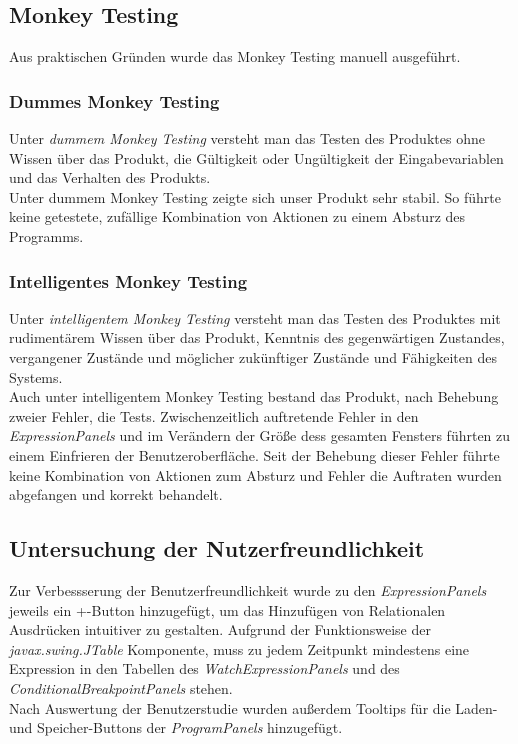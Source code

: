 \documentclass[parskip=full]{scrartcl}
\begin{document}
\subsection{Monkey Testing}
Aus praktischen Gründen wurde das Monkey Testing manuell ausgeführt.
\subsubsection{Dummes Monkey Testing}
Unter \textit{dummem Monkey Testing} versteht man das Testen des Produktes ohne Wissen über das Produkt, die Gültigkeit oder Ungültigkeit der Eingabevariablen und  das Verhalten des Produkts. \\
Unter dummem Monkey Testing zeigte sich unser Produkt sehr stabil. So führte keine getestete, zufällige Kombination von Aktionen zu einem Absturz des Programms. 
\subsubsection{Intelligentes Monkey Testing}
Unter \textit{intelligentem Monkey Testing} versteht man das Testen des Produktes mit rudimentärem Wissen über das Produkt, Kenntnis des gegenwärtigen Zustandes, vergangener Zustände und  möglicher zukünftiger Zustände und Fähigkeiten des Systems. \\
Auch unter intelligentem Monkey Testing bestand das Produkt, nach Behebung zweier Fehler, die Tests. Zwischenzeitlich auftretende Fehler in den \textit{ExpressionPanels} und im Verändern der Größe dess gesamten Fensters führten zu einem Einfrieren der Benutzeroberfläche. Seit der Behebung dieser Fehler führte keine Kombination von Aktionen zum Absturz und Fehler die Auftraten wurden abgefangen und korrekt behandelt.

\subsection{Untersuchung der Nutzerfreundlichkeit}
Zur Verbessserung der Benutzerfreundlichkeit wurde zu den \textit{ExpressionPanels} jeweils ein +-Button hinzugefügt, um das Hinzufügen von Relationalen Ausdrücken intuitiver zu gestalten. Aufgrund der Funktionsweise der \textit{javax.swing.JTable} Komponente, muss zu jedem Zeitpunkt mindestens eine Expression in den Tabellen des \textit{WatchExpressionPanels} und des \textit{ConditionalBreakpointPanels} stehen. \\
Nach Auswertung der Benutzerstudie wurden außerdem Tooltips für die Laden- und Speicher-Buttons der \textit{ProgramPanels} hinzugefügt.
\end{document}
